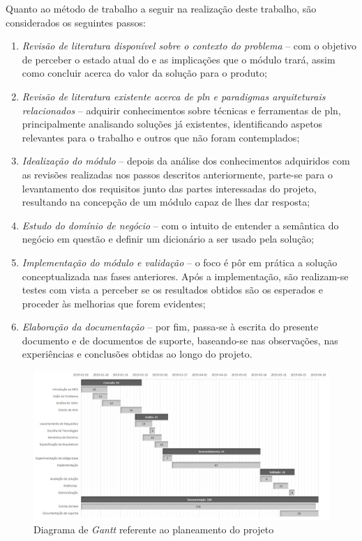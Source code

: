 Quanto ao método de trabalho a seguir na realização deste trabalho, são considerados os seguintes passos:

\begin{enumerate}
    \item 
    {
        \textit{Revisão de literatura disponível sobre o contexto do problema} -- com o objetivo de perceber o estado atual do {\productname} e as implicações que o módulo trará, assim como concluir acerca do valor da solução para o produto;
    }
    \item
    {
        \textit{Revisão de literatura existente acerca de \gls{pln} e paradigmas arquiteturais relacionados} -- adquirir conhecimentos sobre técnicas e ferramentas de \gls{pln}, principalmente analisando soluções já existentes, identificando aspetos relevantes para o trabalho e outros que não foram contemplados;
    }
    \item
    {
        \textit{Idealização do módulo} -- depois da análise dos conhecimentos adquiridos com as revisões realizadas nos passos descritos anteriormente, parte-se para o levantamento dos requisitos junto das partes interessadas do projeto, resultando na concepção de um módulo capaz de lhes dar resposta; 
    }
    \item
    {
        \textit{Estudo do domínio de negócio} -- com o intuito de entender a semântica do negócio em questão e definir um dicionário a ser usado pela solução;
    }
    \item
    {
        \textit{Implementação do módulo e validação} -- o foco é pôr em prática a solução conceptualizada nas fases anteriores. Após a implementação, são realizam-se testes com vista a perceber se os resultados obtidos são os esperados e proceder às melhorias que forem evidentes;
    }
    \item
    {
        \textit{Elaboração da documentação} --  por fim, passa-se à escrita do presente documento e de documentos de suporte, baseando-se nas observações, nas experiências e conclusões obtidas ao longo do projeto.
    }
\end{enumerate}

\clearpage
\begin{figure}
    \centering
    \includegraphics[width=1.0\textwidth]{ch01/assets/gantt.jpg}
    \caption{Diagrama de \textit{Gantt} referente ao planeamento do projeto}
    \label{fig:planning-gantt_chart}
\end{figure}
\clearpage